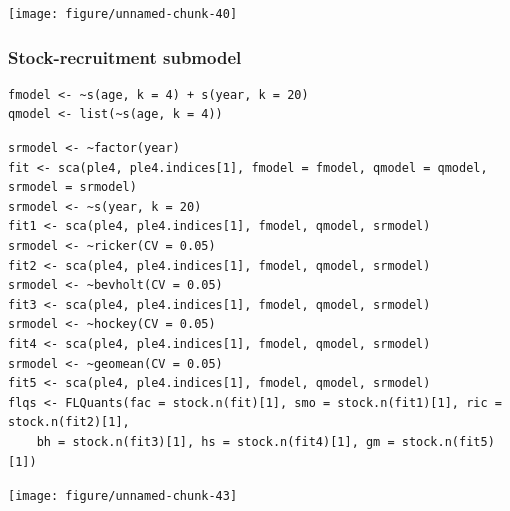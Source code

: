 \documentclass[a4paper,english,10pt]{article}\usepackage[]{graphicx}\usepackage[]{color}
\makeatletter
\newenvironment{kframe}{%
 \def\at@end@of@kframe{}%
 \ifinner\ifhmode%
  \def\at@end@of@kframe{\end{minipage}}%
  \begin{minipage}{\columnwidth}%
 \fi\fi%
 \def\FrameCommand##1{\hskip\@totalleftmargin \hskip-\fboxsep
 \colorbox{shadecolor}{##1}\hskip-\fboxsep
     \hskip-\linewidth \hskip-\@totalleftmargin \hskip\columnwidth}%
 \MakeFramed {\advance\hsize-\width
   \@totalleftmargin\z@ \linewidth\hsize
   \@setminipage}}%
 {\par\unskip\endMakeFramed%
 \at@end@of@kframe}
\newenvironment{knitrout}{}{} %
\makeatother
\begin{document}
\begin{knitrout}
\color{fgcolor}

{\centering \texttt{[image: figure/unnamed-chunk-40]} 

}



\end{knitrout}


\subsubsection{Stock-recruitment submodel}

\begin{knitrout}
\color{fgcolor}\begin{kframe}
\begin{verbatim}
fmodel <- ~s(age, k = 4) + s(year, k = 20)
qmodel <- list(~s(age, k = 4))
\end{verbatim}
\end{kframe}
\end{knitrout}


\begin{knitrout}
\color{fgcolor}\begin{kframe}
\begin{verbatim}
srmodel <- ~factor(year)
fit <- sca(ple4, ple4.indices[1], fmodel = fmodel, qmodel = qmodel, srmodel = srmodel)
srmodel <- ~s(year, k = 20)
fit1 <- sca(ple4, ple4.indices[1], fmodel, qmodel, srmodel)
srmodel <- ~ricker(CV = 0.05)
fit2 <- sca(ple4, ple4.indices[1], fmodel, qmodel, srmodel)
srmodel <- ~bevholt(CV = 0.05)
fit3 <- sca(ple4, ple4.indices[1], fmodel, qmodel, srmodel)
srmodel <- ~hockey(CV = 0.05)
fit4 <- sca(ple4, ple4.indices[1], fmodel, qmodel, srmodel)
srmodel <- ~geomean(CV = 0.05)
fit5 <- sca(ple4, ple4.indices[1], fmodel, qmodel, srmodel)
flqs <- FLQuants(fac = stock.n(fit)[1], smo = stock.n(fit1)[1], ric = stock.n(fit2)[1], 
    bh = stock.n(fit3)[1], hs = stock.n(fit4)[1], gm = stock.n(fit5)[1])
\end{verbatim}
\end{kframe}
\end{knitrout}


\begin{knitrout}
\color{fgcolor}

{\centering \texttt{[image: figure/unnamed-chunk-43]} 

}



\end{knitrout}
\end{document}
